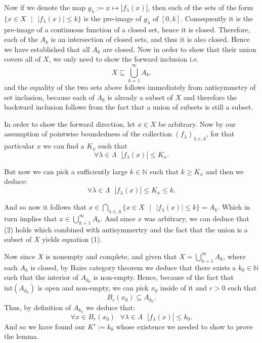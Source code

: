 \documentclass[11pt]{article}
\newcommand\st{\text{ } | \text{ }}
\newcommand\N{\mathbb{N}}
\newcommand\sep{\text{ }}
\begin{document}
 Now if we denote the map $g_\lambda := x \mapsto |f_\lambda(x)| $, then each of the
 sets of the form $\lbrace x \in X \st |f_\lambda(x)| \le k\rbrace$ is the
 pre-image of  $g_\lambda$ of  $[0, k]$. Consequently it is the pre-image of a
 continuous function of a closed set, hence it is closed. Therefore, each of the
 $A_k$ is an intersection of closed sets, and thus it is also closed.
 Hence we have established that all  $A_k$ are closed. Now in order to show that
 their union covers all of  $X$, we only need to show the forward inclusion
 i.e.
 \begin{equation}
    X \subseteq \bigcup_{k = 1}^\infty A_k
  .\end{equation}
 and the equality of the two sets above follows immediately from antisymmetry of set inclusion,
 because each of $A_k$ is already a subset of  $X$ and therefore the backward inclusion follows
 from the fact that a union of subsets is still a subset.

 In order to show the forward direction, let $x \in X$ be arbitrary. Now by our assumption
 of pointwise boundedness of the collection  $\left( f_\lambda \right)_{\lambda \in \Lambda} $,
for that particular $x$ we can find a  $K_x$ such that
$$\forall \lambda \in \Lambda \sep |f_\lambda\left( x \right)| \le K_x. $$

But now we can pick a sufficiently large $k \in \N$ such that  $k \ge K_x$ and then
we deduce:
\[
\forall \lambda \in \Lambda \sep |f_\lambda(x)| \le K_x \le k
.\]

And so now it follows that $x \in \bigcap_{\lambda \in \Lambda}\lbrace x \in X \st
|f_\lambda(x)| \le k \rbrace = A_k$. Which in turn implies that $x \in \bigcup_{k = 1}^\infty A_k$.
And since  $x$ was arbitrary, we can deduce that (2) holds which combined with
antisymmertry and the fact that the union is a subset of $X$ yields equation (1).

Now since $X$ is nonempty and complete, and given that  $X = \bigcup_{k = 1}^\infty A_k$, where
each  $A_k$ is closed, by Baire category theorem we deduce that there exists a
$k_0 \in \N$ such that the interior of  $A_{k_0}$ is non-empty.
Hence, because of the fact that $\text{int}(A_{k_0})$ is open and non-empty, we can pick
$x_0$ inside of it and  $r > 0$ such that
 \[
   B_r(x_0) \subseteq A_{k_0}
.\]
Thus, by definition of $A_{k_0}$ we deduce that:
 \[
 \forall x \in B_r(x_0) \sep \forall \lambda \in \Lambda \sep |f_\lambda(x)| \le k_0
.\]
And so we have found our $K' := k_0$ whose existence we needed to show to prove
the lemma. \hfill \blacksquare
\end{document}
